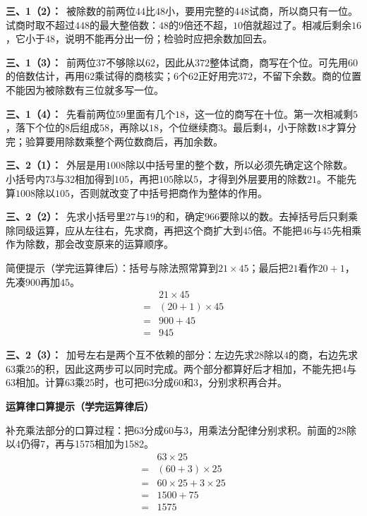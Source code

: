\documentclass[multi=snippet,border=0pt]{standalone}
\newenvironment{snippet}[3]{\begin{minipage}{#1bp}\color{answerred}\fontsize{#2}{#3}\selectfont\raggedright}{\end{minipage}}
\begin{document}
\begin{snippet}{505}{11.5}{14}\textbf{三、1（2）：}\ 被除数的前两位\(44\)比\(48\)小，要用完整的\(448\)试商，所以商只有一位。试商时取不超过\(448\)的最大整倍数：\(48\)的\(9\)倍还不超，\(10\)倍就超过了。相减后剩余\(16\)，它小于\(48\)，说明不能再分出一份；检验时应把余数加回去。\end{snippet}
\begin{snippet}{505}{11.5}{14}\textbf{三、1（3）：}\ 前两位\(37\)不够除以\(62\)，因此从\(372\)整体试商，商写在个位。可先用\(60\)的倍数估计，再用\(62\)乘试得的商核实；\(6\)个\(62\)正好用完\(372\)，不留下余数。商的位置不能因为被除数有三位就多写一位。\end{snippet}
\begin{snippet}{505}{11.5}{14}\textbf{三、1（4）：}\ 先看前两位\(59\)里面有几个\(18\)，这一位的商写在十位。第一次相减剩\(5\)，落下个位的\(8\)后组成\(58\)，再除以\(18\)，个位继续商\(3\)。最后剩\(4\)，小于除数\(18\)才算分完；验算要用除数乘整个两位数商后，再加余数。\end{snippet}
\begin{snippet}{505}{11.5}{14}\textbf{三、2（1）：}\ 外层是用\(1008\)除以中括号里的整个数，所以必须先确定这个除数。小括号内\(73\)与\(32\)相加得到\(105\)，再把\(105\)除以\(5\)，才得到外层要用的除数\(21\)。不能先算\(1008\)除以\(105\)，否则就改变了中括号把商作为整体的作用。\end{snippet}
\begin{snippet}{505}{11.5}{14}\textbf{三、2（2）：}\ 先求小括号里\(27\)与\(19\)的和，确定\(966\)要除以的数。去掉括号后只剩乘除同级运算，应从左往右，先求商，再把这个商扩大到\(45\)倍。不能把\(46\)与\(45\)先相乘作为除数，那会改变原来的运算顺序。\par 简便提示（学完运算律后）：括号与除法照常算到\(21\times45\)；最后把\(21\)看作\(20+1\)，先凑\(900\)再加\(45\)。\[\begin{aligned}&21\times45\\={}&(20+1)\times45\\={}&900+45\\={}&945\end{aligned}\]\end{snippet}
\begin{snippet}{505}{11.5}{14}\textbf{三、2（3）：}\ 加号左右是两个互不依赖的部分：左边先求\(28\)除以\(4\)的商，右边先求\(63\)乘\(25\)的积，因此这两步可以同时完成。两个部分都算好后才相加，不能先把\(4\)与\(63\)相加。计算\(63\)乘\(25\)时，也可把\(63\)分成\(60\)和\(3\)，分别求积再合并。\par\textbf{运算律口算提示（学完运算律后）}\par 补充乘法部分的口算过程：把63分成60与3，用乘法分配律分别求积。前面的28除以4仍得7，再与1575相加为1582。\[\begin{aligned}&63\times25\\={}&(60+3)\times25\\={}&60\times25+3\times25\\={}&1500+75\\={}&1575\end{aligned}\]\end{snippet}
\end{document}
